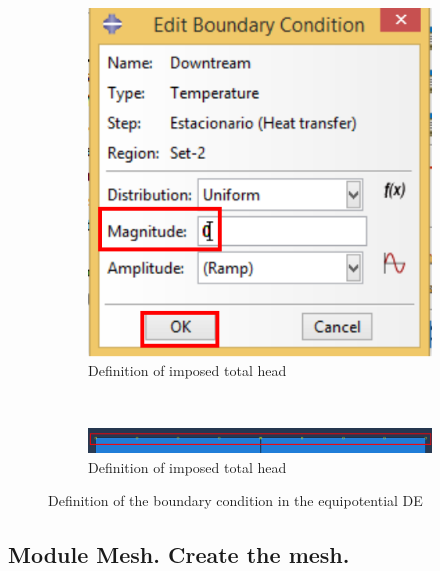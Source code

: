 \begin{figure}[!h]
    \begin{subfigure}[!h]{0.42\textwidth}
      \includegraphics[width=\textwidth]{./body/images/load08.pdf}
      \caption{Definition of imposed total head}
      \label{load08}
    \end{subfigure}%
    ~ %
    \begin{subfigure}[!h]{0.55\textwidth}
      \includegraphics[width=\textwidth]{./body/images/load09.pdf}
      \caption{Definition of imposed total head}
      \label{load09}
    \end{subfigure}%
    \caption{Definition of the boundary condition in the equipotential
      DE}
  \end{figure}


  \subsection{Module Mesh. Create the mesh.}

